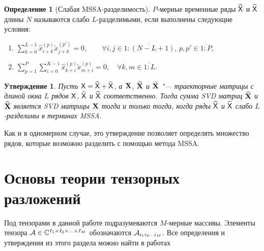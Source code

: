 \documentclass[specialist,
    substylefile = spbu.rtx,
    subf,href,colorlinks=true, 12pt]{disser}
\theoremstyle{plain}
\newtheorem{statement}{Утверждение}[section]
\theoremstyle{definition}
\newtheorem{definition}{Определение}[section]
\theoremstyle{remark}
\begin{document}
    \begin{definition}[Слабая MSSA-разделимость]
        \label{def:mssa-separability}
        $P$-мерные временные ряды $\widehat{\mathsf{X}}$ и $\widetilde{\mathsf{X}}$ длины $N$ называются слабо $L$-разделимыми, если
        выполнены следующие условия:
        \begin{enumerate}
            \item $\displaystyle \sum_{k=0}^{L-1} \hat{x}_{i+k}^{(p)}\tilde{x}_{j+k}^{(p')} = 0,
            \qquad \forall i, j \in \overline{1:(N-L+1)},\, p, p' \in \overline{1:P}$,
            \item $\displaystyle \sum_{p=1}^{P} \sum_{i=0}^{K-1} \hat{x}_{k+i}^{(p)} \tilde{x}_{m+i}^{(p)} = 0, \quad
            \forall k, m \in \overline{1:L}$.
        \end{enumerate}
    \end{definition}

    \begin{statement}
        \label{state:mssa-separability}
        Пусть $\mathsf{X} = \widehat{\mathsf{X}} + \widetilde{\mathsf{X}}$, а $\mathbf{X}$, $\widehat{\mathbf{X}}$ и $\widetilde{\mathbf{X}}$ "--- траекторные
        матрицы с длиной окна $L$ рядов $\mathsf{X}$, $\widehat{\mathsf{X}}$ и $\widetilde{\mathsf{X}}$ соответственно.
        Тогда сумма \emph{SVD} матриц $\widehat{\mathbf{X}}$ и $\widetilde{\mathbf{X}}$ является \emph{SVD} матрицы $\mathbf{X}$ тогда и только тогда, когда
        ряды $\widehat{\mathsf{X}}$ и $\widetilde{\mathsf{X}}$ слабо $L$-разделимы в терминах MSSA.
    \end{statement}
    Как и в одномерном случае, это утверждение позволяет определять множество рядов, которые возможно разделить с
    помощью метода MSSA.


    \section{Основы теории тензорных разложений}\label{sec:tensor-decompositions}
    Под тензорами в данной работе подразумеваются $M$-мерные массивы.
    Элементы тензора $\mathcal{A} \in \mathbb{C}^{I_1 \times I_2 \times \ldots \times I_M}$ обозначаются
    $\mathcal{A}_{i_1 i_2 \ldots i_M}$.
    Все определения и утверждения из этого раздела можно найти в работах~\cite{hosvd, tensors-bg}
\end{document}

